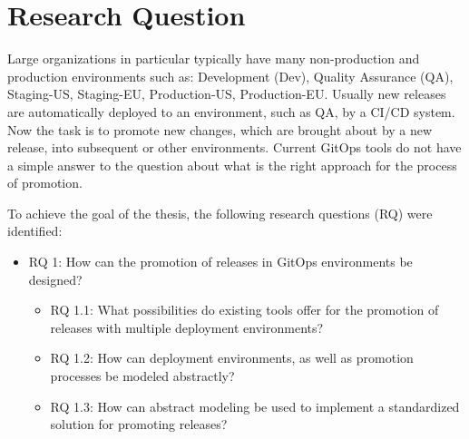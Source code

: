 \chapter{Research Question}

%
Large organizations in particular typically have many
non-production and production environments
such as:
Development (Dev),
Quality Assurance (QA),
Staging-US,
Staging-EU,
Production-US,
Production-EU.
Usually new releases are automatically deployed to an environment,
such as QA, 
by a CI/CD system.
Now the task is to promote
new changes, which are brought about by a new release,
into subsequent or other environments.
Current GitOps tools do not have a simple answer to
the question about what is the right approach for the process of promotion.
\bigskip


\noindent
To achieve the goal of the thesis, the following research questions (RQ) were identified:

\begin{itemize}
	\item RQ 1: How can the promotion of releases in GitOps environments be designed?
	\begin{itemize}
		\item RQ 1.1: What possibilities do existing tools offer for the promotion of releases with multiple deployment environments?
		\item RQ 1.2: How can deployment environments, as well as promotion processes be modeled abstractly?
		\item RQ 1.3: How can abstract modeling be used to implement a standardized solution for promoting releases?
	\end{itemize}
\end{itemize}




